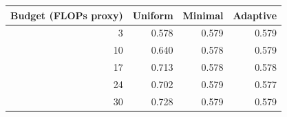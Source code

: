 \begin{tabular}{rrrr}
\toprule
Budget (FLOPs proxy) & Uniform & Minimal & Adaptive \\
\midrule
3 & 0.578 & 0.579 & 0.579 \\
10 & 0.640 & 0.578 & 0.579 \\
17 & 0.713 & 0.578 & 0.578 \\
24 & 0.702 & 0.579 & 0.577 \\
30 & 0.728 & 0.579 & 0.579 \\
\bottomrule
\end{tabular}

